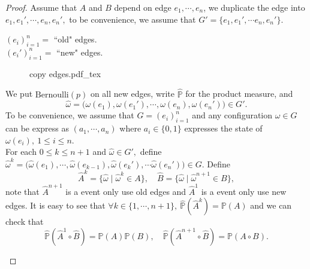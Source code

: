 \documentclass[12pt,a4paper]{report}
\theoremstyle{definition}
\newcommand{\incfig}[1]{%
{#1.pdf_tex}
}
\begin{document}
\begin{enumerate}
\begin{proof}
    Assume that $A$ and $B$ depend on edge $e_1,\cdots , e_n$, we duplicate the edge into $e_1,e_1',\cdots , e_n,e_n',$ to be convenience, we assume that $G'=\{e_1,e_1',\cdots e_n,e_n'\}.$
    \begin{center}
        $(e_i)_{i=1}^n=$ ``old" edges.\\[5pt]
        $(e_i')_{i=1}^n=$ ``new" edges.
    \end{center}
	\begin{figure}[htp]
	\centering
	\def\svgwidth{9cm}
	\incfig{copy edges}
	\end{figure}
	We put $\mathrm{Bernoulli}(p)$ on all new edges, write $\hat{\mathbb{P}}$ for the product measure, and 
	\[
	\hat{\omega}=\big(\omega(e_1),\omega(e_1'),\cdots , \omega(e_n),\omega(e_n')\big)\in G'.
	\]
	To be convenience, we assume that $G=(e_i)_{i=1}^n$ and any configuration $\omega\in G$ can be express as $(a_1,\cdots ,a_n)$ where $a_i\in \{0,1\}$ expresses the state of $\omega(e_i),\ 1\leq i\leq n.$\\
	For each $0\leq k\leq n+1$ and $\hat{\omega}\in G',$ define $\hat{\omega}^k=\big(\hat{\omega}(e_1),\cdots , \hat{\omega}(e_{k-1}),\hat{\omega}(e_k'),\cdots \hat{\omega}(e_n')\big)\in G.$ Define
	\[
	\hat{A}^k=\{\hat{\omega}\mid\hat{\omega}^k\in A\},\quad \hat{B}=\{\hat{\omega}\mid \hat{\omega}^{n+1}\in B\},
	\]
    note that $\hat{A}^{n+1}$ is a event only use old edges and $\hat{A}^1$ is a event only use new edges.
	It is easy to see that $\forall k\in \{1,\cdots ,n+1\},\ \hat{\mathbb{P}}(\hat{A}^k)=\mathbb{P}(A)$ and we can check that 
	\[
	\hat{\mathbb{P}}(\hat{A}^1\circ \hat{B})=\mathbb{P}(A)\mathbb{P}(B),\quad \hat{\mathbb{P}}(\hat{A}^{n+1}\circ \hat{B})=\mathbb{P}(A\circ B).
	\]
    \begin{center}
\end{center}
\end{proof}
\end{enumerate}
\end{document}
